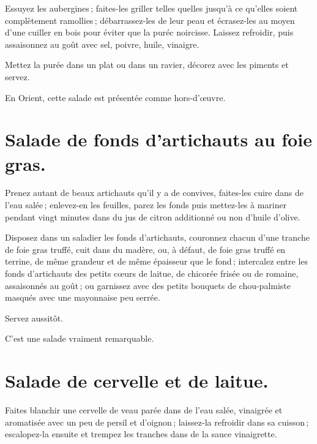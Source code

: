 Essuyez les aubergines ; faites-les griller telles quelles jusqu'à ce qu'elles
soient complètement ramollies ; débarrassez-les de leur peau et écrasez-les au
moyen d'une cuiller en bois pour éviter que la puréc noircisse. Laissez
refroidir, puis assaisonnez au goût avec sel, poivre, huile, vinaigre.

Mettez la purée dans un plat ou dans un ravier, décorez avec les piments et
servez.

\medskip

En Orient, cette salade est présentée comme hors-d'œuvre.

\section*{\centering Salade de fonds d'artichauts au foie gras.}
{}

Prenez autant de beaux artichauts qu'il y a de convives, faites-les cuire dans
de l'eau salée ; enlevez-en les feuilles, parez les fonds puis mettez-les
à mariner pendant vingt minutes dans du jus de citron additionné ou non d'huile
d'olive.

Disposez dans un saladier les fonds d’artichauts, couronnez chacun d'une
tranche de foie gras truffé, cuit dans du madère, ou, à défaut, de foie gras
truffé en terrine, de même grandeur et de même épaisseur que le fond ;
intercalez entre les fonds d'artichauts des petits cœurs de laitue, de chicorée
frisée ou de romaine, assaisonnés au goût ; ou garnissez avec des petits
bouquets de chou-palmiste masqués avec une mayonnaise peu serrée.

Servez aussitôt.

C'est une salade vraiment remarquable.

\section*{\centering Salade de cervelle et de laitue.}
{}

Faites blanchir une cervelle de veau parée dans de l'eau salée, vinaigrée et
aromatisée avec un peu de persil et d'oignon ; laissez-la refroidir dans sa
cuisson ; escalopez-la ensuite et trempez les tranches dans de la sauce
vinaigrette.

